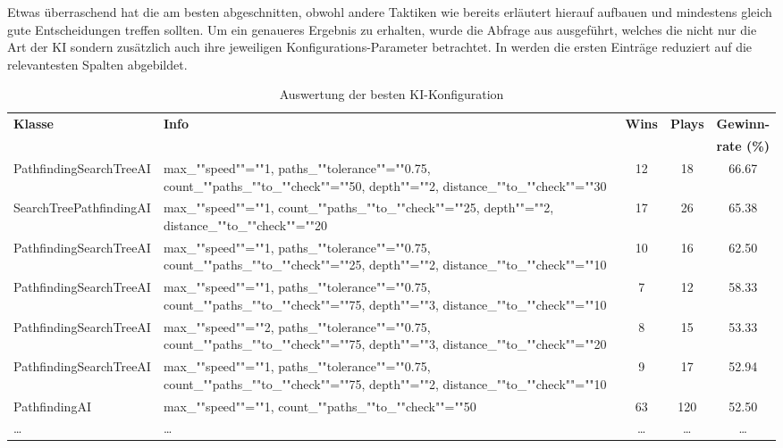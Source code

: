 Etwas überraschend hat die  am besten abgeschnitten, obwohl andere Taktiken wie bereits
erläutert hierauf aufbauen und mindestens gleich gute Entscheidungen treffen sollten.
Um ein genaueres Ergebnis zu erhalten, wurde die Abfrage aus  ausgeführt, welches die
nicht nur die Art der \ac{KI} sondern zusätzlich auch ihre jeweiligen Konfigurations-Parameter betrachtet.
In  werden die ersten Einträge reduziert auf die relevantesten Spalten
abgebildet.

\begin{table}[htb]
    \centering
    \begin{tabularx}{\textwidth}{|X|X|c|c|c|}
        \hline
		\textbf{Klasse} & \textbf{Info} & \textbf{Wins} & \textbf{Plays} & \textbf{Gewinn-} \\
                        &               &               &                & \textbf{rate (\%)} \\ \hline
        Path\-finding\-Search\-Tree\-AI & max\_""speed""=""1, paths\_""tolerance""=""0.75, count\_""paths\_""to\_""check""=""50, depth""=""2, distance\_""to\_""check""=""30 & 12 & 18 & 66.67 \\ \hline
        Search\-Tree\-Path\-finding\-AI & max\_""speed""=""1, count\_""paths\_""to\_""check""=""25, depth""=""2, distance\_""to\_""check""=""20 & 17 & 26 & 65.38 \\ \hline
        Path\-finding\-Search\-Tree\-AI & max\_""speed""=""1, paths\_""tolerance""=""0.75, count\_""paths\_""to\_""check""=""25, depth""=""2, distance\_""to\_""check""=""10 & 10 & 16 & 62.50 \\ \hline
        Path\-finding\-Search\-Tree\-AI & max\_""speed""=""1, paths\_""tolerance""=""0.75, count\_""paths\_""to\_""check""=""75, depth""=""3, distance\_""to\_""check""=""10 & 7 & 12 & 58.33 \\ \hline
        Path\-finding\-Search\-Tree\-AI & max\_""speed""=""2, paths\_""tolerance""=""0.75, count\_""paths\_""to\_""check""=""75, depth""=""3, distance\_""to\_""check""=""20 & 8 & 15 & 53.33 \\ \hline
        Path\-finding\-Search\-Tree\-AI & max\_""speed""=""1, paths\_""tolerance""=""0.75, count\_""paths\_""to\_""check""=""75, depth""=""2, distance\_""to\_""check""=""10 & 9 & 17 & 52.94 \\ \hline
        Path\-finding\-AI & max\_""speed""=""1, count\_""paths\_""to\_""check""=""50 & 63 & 120 & 52.50 \\ \hline
        \ldots & \ldots & \ldots & \ldots & \ldots \\ \hline
    \end{tabularx}
    \caption{Auswertung der besten \ac{KI}-Konfiguration}
    \label{tab:evaluation-ki-konfiguration}
\end{table}

